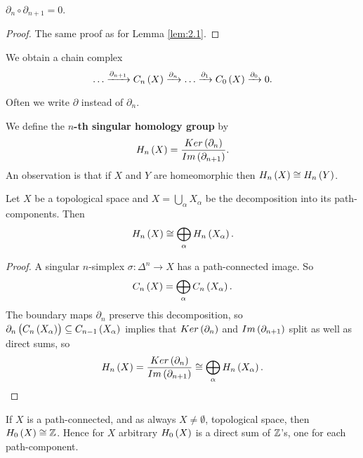 \begin{lemma}
$ \partial_n \circ \partial_{n + 1} = 0 $.
\end{lemma}

\begin{proof}
The same proof as for Lemma \ref{lem:2.1}.
\end{proof}

We obtain a chain complex
$$ \dots \xrightarrow{\partial_{n + 1}} C_n\br{X} \xrightarrow{\partial_n} \dots \xrightarrow{\partial_1} C_0\br{X} \xrightarrow{\partial_0} 0. $$

\begin{remark*}
Often we write $ \partial $ instead of $ \partial_n $.
\end{remark*}

We define the \textbf{$ n $-th singular homology group} by
$$ H_n\br{X} = \dfrac{Ker\br{\partial_n}}{Im\br{\partial_{n + 1}}}. $$
An observation is that if $ X $ and $ Y $ are homeomorphic then $ H_n\br{X} \cong H_n\br{Y} $.

\begin{proposition}
\label{prop:2.6}
Let $ X $ be a topological space and $ X = \bigcup_\alpha X_\alpha $ be the decomposition into its path-components. Then
$$ H_n\br{X} \cong \bigoplus_\alpha H_n\br{X_\alpha}. $$
\end{proposition}

\begin{proof}
A singular $ n $-simplex $ \sigma : \Delta^n \to X $ has a path-connected image. So
$$ C_n\br{X} = \bigoplus_\alpha C_n\br{X_\alpha}. $$
The boundary maps $ \partial_n $ preserve this decomposition, so $ \partial_n\br{C_n\br{X_\alpha}} \subseteq C_{n - 1}\br{X_\alpha} $ implies that $ Ker\br{\partial_n} $ and $ Im\br{\partial_{n + 1}} $ split as well as direct sums, so
$$ H_n\br{X} = \dfrac{Ker\br{\partial_n}}{Im\br{\partial_{n + 1}}} \cong \bigoplus_\alpha H_n\br{X_\alpha}. $$
\end{proof}

\pagebreak

\begin{proposition}
\label{prop:2.7}
If $ X $ is a path-connected, and as always $ X \ne \emptyset $, topological space, then $ H_0\br{X} \cong \Z $. Hence for $ X $ arbitrary $ H_0\br{X} $ is a direct sum of $ \mathbb{Z} $'s, one for each path-component.
\end{proposition}

